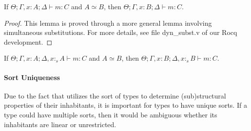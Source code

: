 \begin{corollary}
  If $\Theta ; \Gamma, x : A ; \Delta \vdash m : C$ and 
  $A \simeq B$, then $\Theta ; \Gamma, x : B ; \Delta \vdash m : C$.
\end{corollary}

\begin{proof}
  This lemma is proved through a more general lemma involving simultaneous substitutions. 
  For more details, see file \textsf{dyn\_subst.v} of our Rocq development.
\end{proof}

\begin{corollary}
  If ${\Theta ; \Gamma, x : A ; \Delta, x :_s A \vdash m : C}$ and
  $A \simeq B$, then ${\Theta ; \Gamma, x : B ; \Delta, x :_s B \vdash m : C}$.
\end{corollary}

\paragraph{\textbf{Sort Uniqueness}}
Due to the fact that \TLLC{} utilizes the sort of types to determine
(sub)structural properties of their inhabitants, it is important for types
to have unique sorts. If a type could have multiple sorts, then it would be
ambiguous whether its inhabitants are linear or unrestricted.

